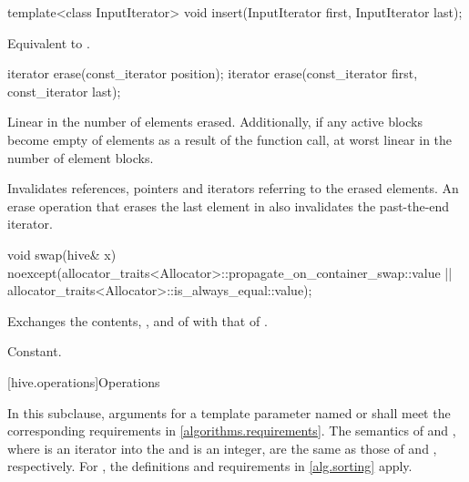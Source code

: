 %
\begin{itemdecl}
template<class InputIterator>
  void insert(InputIterator first, InputIterator last);
\end{itemdecl}

\begin{itemdescr}
\pnum
\effects
Equivalent to .
\end{itemdescr}

%
\begin{itemdecl}
iterator erase(const_iterator position);
iterator erase(const_iterator first, const_iterator last);
\end{itemdecl}

\begin{itemdescr}
\pnum
\complexity
Linear in the number of elements erased.
Additionally, if any active blocks become empty of elements
as a result of the function call,
at worst linear in the number of element blocks.

\pnum
\remarks
Invalidates references, pointers and iterators
referring to the erased elements.
An erase operation that erases the last element in 
also invalidates the past-the-end iterator.
\end{itemdescr}

%
\begin{itemdecl}
void swap(hive& x)
  noexcept(allocator_traits<Allocator>::propagate_on_container_swap::value ||
           allocator_traits<Allocator>::is_always_equal::value);
\end{itemdecl}

\begin{itemdescr}
\pnum
\effects
Exchanges the contents, , and 
of  with that of .

\pnum
\complexity
Constant.
\end{itemdescr}

[hive.operations]{Operations}

\pnum
In this subclause,
arguments for a template parameter
named  or 
shall meet the corresponding requirements in \ref{algorithms.requirements}.
The semantics of  and ,
where  is an iterator into the  and  is an integer,
are the same as those of  and , respectively.
For , the definitions and requirements in \ref{alg.sorting} apply.

